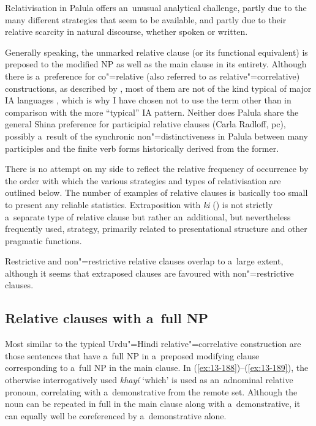 Relativisation in Palula offers an~unusual analytical challenge, partly due to the many different strategies that seem to be available, and partly due to their relative scarcity in natural discourse, whether spoken or written. 



Generally speaking, the unmarked relative clause (or its functional equivalent) is preposed to the modified NP as well as the main clause in its entirety. Although there is a~preference for co"=relative (also referred to as relative"=correlative) constructions, as described by \citet{downing1974}, most of them are not of the kind typical of major IA languages \citep[410--415]{masica1991}, which is why I have chosen not to use the term other than in comparison with the more ``typical'' IA pattern. Neither does Palula share the general Shina preference for participial relative clauses (Carla Radloff, pc), possibly a~result of the synchronic non"=distinctiveness in Palula between many participles and the finite verb forms historically derived from the former.



There is no attempt on my side to reflect the relative frequency of occurrence by the order with which the various strategies and types of relativisation are outlined below. The number of examples of relative clauses is basically too small to present any reliable statistics. Extraposition with \textit{ki} () is not strictly a~separate type of relative clause but rather an~additional, but nevertheless frequently used, strategy, primarily related to presentational structure and other pragmatic functions.



Restrictive and non"=restrictive relative clauses overlap to a~large extent, although it seems that extraposed clauses are favoured with non"=restrictive clauses.


\subsection{Relative clauses with a~full NP}
\label{subsec:13-6-1}


Most similar to the typical Urdu"=Hindi relative"=correlative construction are those sentences that have a~full NP in a~preposed modifying clause corresponding to a~full NP in the main clause. In (\ref{ex:13-188})--(\ref{ex:13-189}), the otherwise interrogatively used \textit{khayí} `which' is used as an~adnominal relative pronoun, correlating with a~demonstrative from the remote set. Although the noun can be repeated in full in the main clause along with a~demonstrative, it can equally well be coreferenced by a~demonstrative alone.



